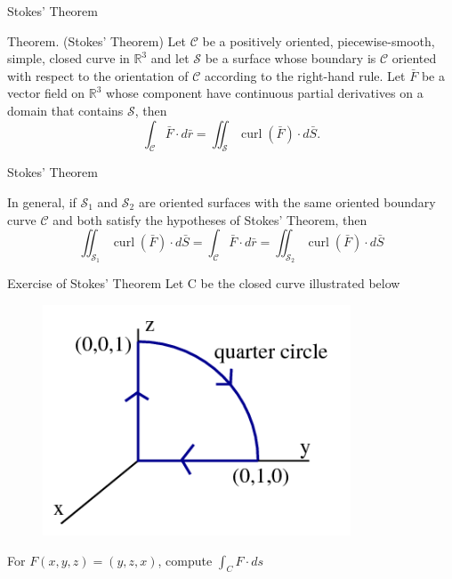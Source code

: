 \documentclass{beamer}
\begin{document}
\begin{frame}{Stokes' Theorem}
        \par \textcolor{yy}{Theorem. (Stokes' Theorem)} Let $\mathcal{C}$ be a positively oriented, piecewise-smooth, simple, closed curve in $\mathbb{R}^3$ and let $\mathcal{S}$ be a surface whose boundary is $\mathcal{C}$ oriented with respect to the orientation of $\mathcal{C}$ according to the right-hand rule. Let $\bar{F}$ be a vector field on $\mathbb{R}^3$ whose component have continuous partial derivatives on a domain that contains $\mathcal{S}$, then 
        \begin{equation*}
            \int_{\mathcal{C}} \bar{F} \cdot d \bar{r} = \iint_{\mathcal{S}} \operatorname{curl}(\bar{F}) \cdot d \bar{S}.
        \end{equation*}
    \end{frame}

 


    \begin{frame}{Stokes' Theorem}
        \par In general, if $\mathcal{S}_1$ and $\mathcal{S}_2$ are oriented surfaces with the same oriented boundary curve $\mathcal{C}$ and both satisfy the hypotheses of Stokes' Theorem, then 
        \begin{equation*}
            \iint_{\mathcal{S}_1} \operatorname{curl}(\bar{F}) \cdot d \bar{S} = \int_{\mathcal{C}} \bar{F} \cdot d \bar{r} = \iint_{\mathcal{S}_2} \operatorname{curl}(\bar{F}) \cdot d \bar{S}
        \end{equation*}
    \end{frame}



    \begin{frame}{Exercise of Stokes' Theorem}
    Let C be the closed curve illustrated below
    \begin{figure}[H]
        \centering
        \includegraphics[width=0.5\linewidth]{1.png}
    
        \label{fig:1}
    \end{figure}
        For $F(x, y, z) = (y, z, x)$, compute $\int_C F\cdot ds$
    \end{frame}
\end{document}
